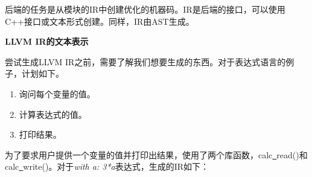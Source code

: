后端的任务是从模块的IR中创建优化的机器码。IR是后端的接口，可以使用C++接口或文本形式创建。同样，IR由AST生成。\par

\hspace*{\fill} \par %
\textbf{LLVM IR的文本表示}

尝试生成LLVM IR之前，需要了解我们想要生成的东西。对于表达式语言的例子，计划如下。

\begin{enumerate}
\item 询问每个变量的值。
\item 计算表达式的值。
\item 打印结果。
\end{enumerate}

为了要求用户提供一个变量的值并打印出结果，使用了两个库函数，calc\underline{~}read()和calc\underline{~}write()。对于\textit{with a: 3*a}表达式，生成的IR如下：\par

